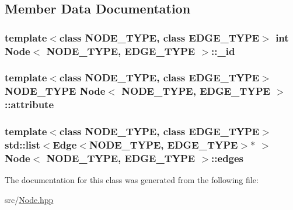 \subsection{Member Data Documentation}
\hypertarget{class_node_a533ab17912d5b919a37ada31a8a78dc4}{
\subsubsection[{\+\_\+id}]{\setlength{\rightskip}{0pt plus 5cm}template$<$class N\+O\+D\+E\+\_\+\+T\+Y\+P\+E, class E\+D\+G\+E\+\_\+\+T\+Y\+P\+E$>$ int {\bf Node}$<$ N\+O\+D\+E\+\_\+\+T\+Y\+P\+E, E\+D\+G\+E\+\_\+\+T\+Y\+P\+E $>$\+::\+\_\+id\hspace{0.3cm}{\ttfamily [private]}}}\label{class_node_a533ab17912d5b919a37ada31a8a78dc4}
\hypertarget{class_node_a434cad0f70931bc3aaa048d52d0b0ee3}{
\subsubsection[{attribute}]{\setlength{\rightskip}{0pt plus 5cm}template$<$class N\+O\+D\+E\+\_\+\+T\+Y\+P\+E, class E\+D\+G\+E\+\_\+\+T\+Y\+P\+E$>$ N\+O\+D\+E\+\_\+\+T\+Y\+P\+E {\bf Node}$<$ N\+O\+D\+E\+\_\+\+T\+Y\+P\+E, E\+D\+G\+E\+\_\+\+T\+Y\+P\+E $>$\+::attribute\hspace{0.3cm}{\ttfamily [private]}}}\label{class_node_a434cad0f70931bc3aaa048d52d0b0ee3}
\hypertarget{class_node_a9e71d509f953dc57eddb20e3223dd6d1}{
\subsubsection[{edges}]{\setlength{\rightskip}{0pt plus 5cm}template$<$class N\+O\+D\+E\+\_\+\+T\+Y\+P\+E, class E\+D\+G\+E\+\_\+\+T\+Y\+P\+E$>$ std\+::list$<${\bf Edge}$<$N\+O\+D\+E\+\_\+\+T\+Y\+P\+E, E\+D\+G\+E\+\_\+\+T\+Y\+P\+E$>$$\ast$ $>$ {\bf Node}$<$ N\+O\+D\+E\+\_\+\+T\+Y\+P\+E, E\+D\+G\+E\+\_\+\+T\+Y\+P\+E $>$\+::edges\hspace{0.3cm}{\ttfamily [private]}}}\label{class_node_a9e71d509f953dc57eddb20e3223dd6d1}


The documentation for this class was generated from the following file\+:\begin{DoxyCompactItemize}
\item 
src/\hyperlink{_node_8hpp}{Node.\+hpp}\end{DoxyCompactItemize}
